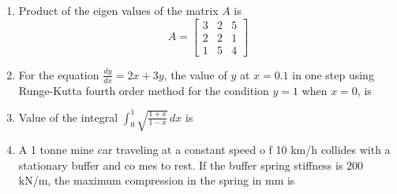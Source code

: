 \documentclass[journal]{IEEEtran}
\begin{document}
\begin{enumerate}
\item 
Product of the eigen values of the matrix $A$ is 
\[
A = \begin{bmatrix}
3 & 2 & 5 \\
2 & 2 & 1 \\
1 & 5 & 4
\end{bmatrix}
\]
\begin{enumerate}
\end{enumerate}

\item 
For the equation $\frac{dy}{dx} = 2x + 3y$, the value of $y$ at $x = 0.1$ in one step using Runge-Kutta fourth order method for the condition $y = 1$ when $x = 0$, is 
\begin{enumerate}
\end{enumerate}

\item 
Value of the integral $\int_{0}^{1} \sqrt{\frac{1+x}{1-x}} \, dx$ is 
\begin{enumerate}
\end{enumerate}

\item A 1 tonne mine car traveling at a constant speed o    f 10 km/h collides with a stationary buffer and co    mes to rest. If the buffer spring stiffness is 200     kN/m, the maximum compression in the spring in mm     is                        
\begin{enumerate}                                 
	\begin{multicols}{4}                     
	\item 49                                 
	\item 98                                 
	\item 196                                
	\item 247                                
	             \end{multicols}              
\end{enumerate}



\end{enumerate}
\end{document}
